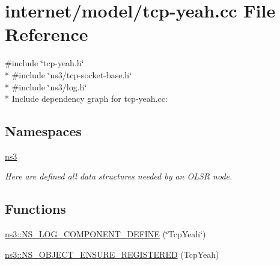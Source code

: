 \hypertarget{tcp-yeah_8cc}{}\section{internet/model/tcp-\/yeah.cc File Reference}
\label{tcp-yeah_8cc}
{\ttfamily \#include \char`\"{}tcp-\/yeah.\+h\char`\"{}}\\*
{\ttfamily \#include \char`\"{}ns3/tcp-\/socket-\/base.\+h\char`\"{}}\\*
{\ttfamily \#include \char`\"{}ns3/log.\+h\char`\"{}}\\*
Include dependency graph for tcp-\/yeah.cc\+:
\subsection*{Namespaces}
\begin{DoxyCompactItemize}
\item 
 \hyperlink{namespacens3}{ns3}
\begin{DoxyCompactList}\small\item\em Here are defined all data structures needed by an O\+L\+SR node. \end{DoxyCompactList}\end{DoxyCompactItemize}
\subsection*{Functions}
\begin{DoxyCompactItemize}
\item 
\hyperlink{namespacens3_a76665e8bd0b49992de959a81511533e5}{ns3\+::\+N\+S\+\_\+\+L\+O\+G\+\_\+\+C\+O\+M\+P\+O\+N\+E\+N\+T\+\_\+\+D\+E\+F\+I\+NE} (\char`\"{}Tcp\+Yeah\char`\"{})
\item 
\hyperlink{namespacens3_a846edea577cc7d26ae525735567c4f25}{ns3\+::\+N\+S\+\_\+\+O\+B\+J\+E\+C\+T\+\_\+\+E\+N\+S\+U\+R\+E\+\_\+\+R\+E\+G\+I\+S\+T\+E\+R\+ED} (Tcp\+Yeah)
\end{DoxyCompactItemize}
